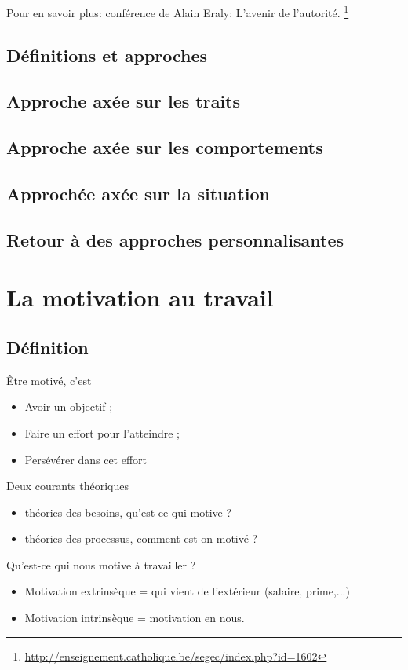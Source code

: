 \documentclass[12pt]{article}
\begin{document}
	Pour en savoir plus: conférence de Alain Eraly: L'avenir de l'autorité. \footnote{\url{http://enseignement.catholique.be/segec/index.php?id=1602}}
	
	\subsection{Définitions et approches}
	
	
	\subsection{Approche axée sur les traits}
	\subsection{Approche axée sur les comportements}
	\subsection{Approchée axée sur la situation}
	\subsection{Retour à des approches personnalisantes}
	

\section{La motivation au travail}
	\subsection{Définition}
		Être motivé, c'est
		\begin{itemize}
			\item Avoir un objectif ;
			\item Faire un effort pour l'atteindre ;
			\item Persévérer dans cet effort
		 \end{itemize}

		 Deux courants théoriques
		 \begin{itemize}
		 	\item théories des besoins, qu'est-ce qui motive ?
			\item théories des processus, comment est-on motivé ?
		 \end{itemize}

		 Qu'est-ce qui nous motive à travailler ?
		 \begin{itemize}
		 	\item Motivation extrinsèque = qui vient de l'extérieur (salaire, prime,...)
			\item Motivation intrinsèque = motivation en nous.
		 \end{itemize}
\end{document}
